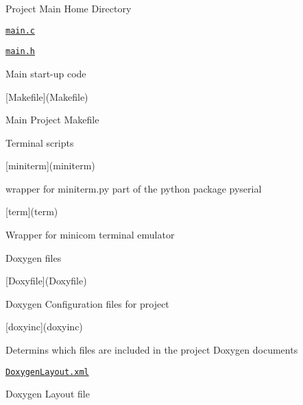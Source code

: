\begin{DoxyItemize}
\item Project Main Home Directory
\begin{DoxyItemize}
\item \href{main.c}{\tt main.\+c}
\item \href{main.h}{\tt main.\+h}
\begin{DoxyItemize}
\item Main start-\/up code
\end{DoxyItemize}
\item \mbox{[}Makefile\mbox{]}(Makefile)
\begin{DoxyItemize}
\item Main Project Makefile
\end{DoxyItemize}
\end{DoxyItemize}
\item Terminal scripts
\begin{DoxyItemize}
\item \mbox{[}miniterm\mbox{]}(miniterm)
\begin{DoxyItemize}
\item wrapper for miniterm.\+py part of the python package pyserial
\end{DoxyItemize}
\item \mbox{[}term\mbox{]}(term)
\begin{DoxyItemize}
\item Wrapper for minicom terminal emulator
\end{DoxyItemize}
\end{DoxyItemize}
\item Doxygen files
\begin{DoxyItemize}
\item \mbox{[}Doxyfile\mbox{]}(Doxyfile)
\begin{DoxyItemize}
\item Doxygen Configuration files for project
\end{DoxyItemize}
\item \mbox{[}doxyinc\mbox{]}(doxyinc)
\begin{DoxyItemize}
\item Determins which files are included in the project Doxygen documents
\end{DoxyItemize}
\item \href{DoxygenLayout.xml}{\tt Doxygen\+Layout.\+xml}
\begin{DoxyItemize}
\item Doxygen Layout file
\end{DoxyItemize}

\end{DoxyItemize}
\end{DoxyItemize}
